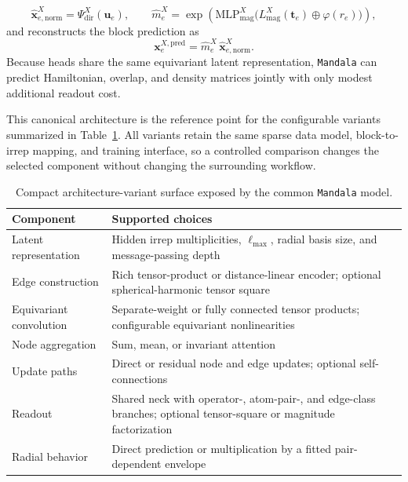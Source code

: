 \documentclass[preprint,12pt,compress,numafflabel]{elsarticle}
\begin{document}
\begin{equation}
\widehat{\bm{x}}_{e,\mathrm{norm}}^{X}
=
\Psi_{\mathrm{dir}}^{X}(\bm{u}_{e}),
\qquad
\widehat{m}_{e}^{X}
=
\exp\!\left(
\mathrm{MLP}_{\mathrm{mag}}^{X}
\bigl(
L_{\mathrm{mag}}^{X}(\bm{t}_{e})
\oplus
\varphi(r_e)
\bigr)
\right),
\end{equation}
and reconstructs the block prediction as
\begin{equation}
\bm{x}_{e}^{X,\mathrm{pred}}
=
\widehat{m}_{e}^{X}\,
\widehat{\bm{x}}_{e,\mathrm{norm}}^{X}.
\end{equation}
Because heads share the same equivariant latent representation, \texttt{Mandala} can predict Hamiltonian, overlap, and density matrices jointly with only modest additional readout cost.

This canonical architecture is the reference point for the configurable variants summarized in Table~\ref{tab:architecture-variants}. All variants retain the same sparse data model, block-to-irrep mapping, and training interface, so a controlled comparison changes the selected component without changing the surrounding workflow.

\begin{table}[H]
\centering
\small
\caption{Compact architecture-variant surface exposed by the common \texttt{Mandala} model.}
\label{tab:architecture-variants}
\begin{tabular}{p{}p{}}
\toprule
Component & Supported choices \\
\midrule
Latent representation & Hidden irrep multiplicities, $\ell_{\max}$, radial basis size, and message-passing depth \\
Edge construction & Rich tensor-product or distance-linear encoder; optional spherical-harmonic tensor square \\
Equivariant convolution & Separate-weight or fully connected tensor products; configurable equivariant nonlinearities \\
Node aggregation & Sum, mean, or invariant attention \\
Update paths & Direct or residual node and edge updates; optional self-connections \\
Readout & Shared neck with operator-, atom-pair-, and edge-class branches; optional tensor-square or magnitude factorization \\
Radial behavior & Direct prediction or multiplication by a fitted pair-dependent envelope \\
\bottomrule
\end{tabular}
\end{table}
\end{document}
